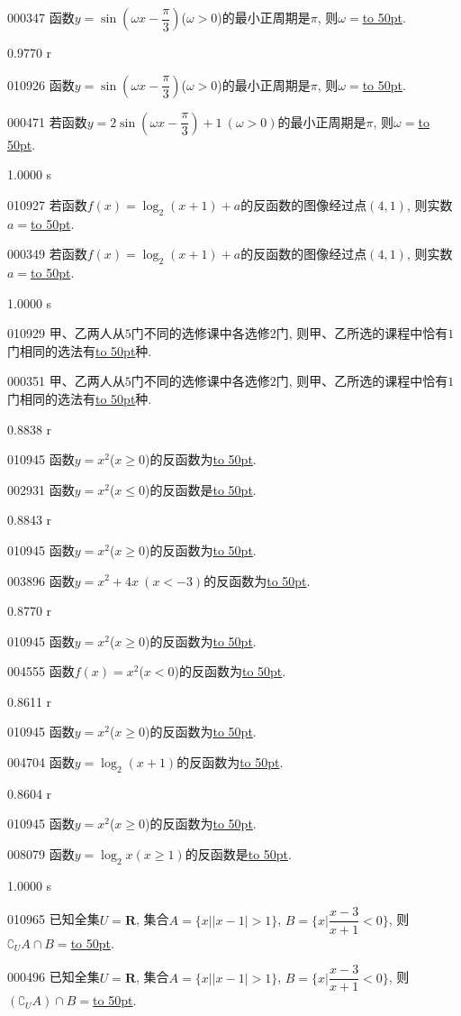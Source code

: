 \documentclass[10pt,a4paper]{article}
\newcommand{\blank}[1]{\underline{\hbox to #1pt{}}}
\begin{document}
000347	函数$y=\sin (\omega x-\dfrac{\pi}{3})$($\omega >0$)的最小正周期是$\pi$, 则$\omega =$\blank{50}.

0.9770 r

010926	函数$y=\sin( \omega x-\dfrac{\pi}{3})$($\omega >0$)的最小正周期是$\pi$, 则$\omega =$\blank{50}.

000471	若函数$y=2\sin (\omega x-\dfrac\pi 3)+1 \ (\omega >0)$的最小正周期是$\pi$, 则$\omega=$\blank{50}.

1.0000 s

010927	若函数$f(x)=\log_2(x+1)+a$的反函数的图像经过点$(4, 1)$, 则实数$a=$\blank{50}.

000349	若函数$f(x)=\log_2 (x+1)+a$的反函数的图像经过点$(4,1)$, 则实数$a=$\blank{50}.

1.0000 s

010929	甲、乙两人从$5$门不同的选修课中各选修$2$门, 则甲、乙所选的课程中恰有$1$门相同的选法有\blank{50}种.

000351	甲、乙两人从$5$门不同的选修课中各选修$2$门, 则甲、乙所选的课程中恰有$1$门相同的选法有\blank{50}种.

0.8838 r

010945	函数$y=x^2$($x\ge 0$)的反函数为\blank{50}.

002931	函数$y=x^2$($x\le 0$)的反函数是\blank{50}.

0.8843 r

010945	函数$y=x^2$($x\ge 0$)的反函数为\blank{50}.

003896	函数$y=x^2+4x \ (x<-3)$的反函数为\blank{50}.

0.8770 r

010945	函数$y=x^2$($x\ge 0$)的反函数为\blank{50}.

004555	函数$f(x)=x^2$($x<0$)的反函数为\blank{50}.

0.8611 r

010945	函数$y=x^2$($x\ge 0$)的反函数为\blank{50}.

004704	函数$y=\log_2(x+1)$的反函数为\blank{50}.

0.8604 r

010945	函数$y=x^2$($x\ge 0$)的反函数为\blank{50}.

008079	函数$y=\log _2x(x\ge 1)$的反函数是\blank{50}.

1.0000 s

010965	已知全集$U=\mathbf{R}$, 集合$A=\{x||x-1|>1\}$, $B=\{x|\dfrac{x-3}{x+1}<0\}$, 则$\complement _UA\cap B=$\blank{50}.

000496	已知全集$U=\mathbf{R}$, 集合$A=\{x||x-1|>1\}$, $B=\{x|\dfrac{x-3}{x+1}<0\}$, 则$(\complement_U A)\cap B=$\blank{50}.
\end{document}
